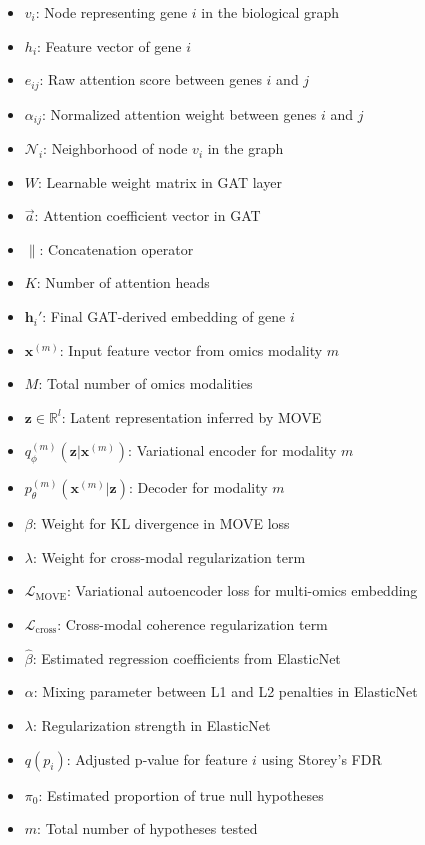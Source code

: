 \documentclass[12pt]{article}
\begin{document}
\begin{itemize}
  \item \( v_i \): Node representing gene \( i \) in the biological graph
  \item \( h_i \): Feature vector of gene \( i \)
  \item \( e_{ij} \): Raw attention score between genes \( i \) and \( j \)
  \item \( \alpha_{ij} \): Normalized attention weight between genes \( i \) and \( j \)
  \item \( \mathcal{N}_i \): Neighborhood of node \( v_i \) in the graph
  \item \( W \): Learnable weight matrix in GAT layer
  \item \( \vec{a} \): Attention coefficient vector in GAT
  \item \( \parallel \): Concatenation operator
  \item \( K \): Number of attention heads
  \item \( \mathbf{h}_i' \): Final GAT-derived embedding of gene \( i \)
  \item \( \mathbf{x}^{(m)} \): Input feature vector from omics modality \( m \)
  \item \( M \): Total number of omics modalities
  \item \( \mathbf{z} \in \mathbb{R}^l \): Latent representation inferred by MOVE
  \item \( q_\phi^{(m)}(\mathbf{z}|\mathbf{x}^{(m)}) \): Variational encoder for modality \( m \)
  \item \( p_\theta^{(m)}(\mathbf{x}^{(m)}|\mathbf{z}) \): Decoder for modality \( m \)
  \item \( \beta \): Weight for KL divergence in MOVE loss
  \item \( \lambda \): Weight for cross-modal regularization term
  \item \( \mathcal{L}_{\text{MOVE}} \): Variational autoencoder loss for multi-omics embedding
  \item \( \mathcal{L}_{\text{cross}} \): Cross-modal coherence regularization term
  \item \( \hat{\beta} \): Estimated regression coefficients from ElasticNet
  \item \( \alpha \): Mixing parameter between L1 and L2 penalties in ElasticNet
  \item \( \lambda \): Regularization strength in ElasticNet
  \item \( q(p_i) \): Adjusted p-value for feature \( i \) using Storey's FDR
  \item \( \pi_0 \): Estimated proportion of true null hypotheses
  \item \( m \): Total number of hypotheses tested
\end{itemize}
\end{document}
